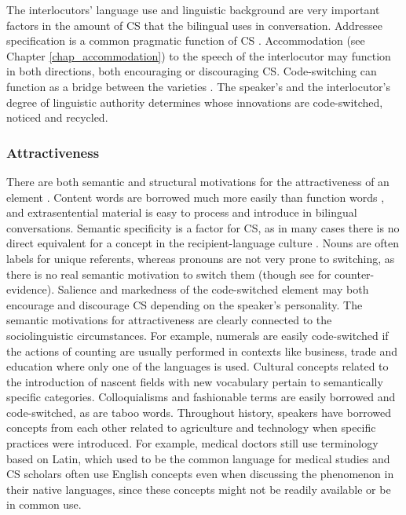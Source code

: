 \documentclass[output=paper]{langscibook}
\begin{document}
The interlocutors' language use and linguistic background are very important factors in the amount of CS that the bilingual uses in conversation. Addressee specification is a common pragmatic function of CS \parencite{gumperz1982discourse}. Accommodation (see Chapter \ref{chap_accommodation}) to the speech of the interlocutor may function in both directions, both encouraging or discouraging CS. Code-switching can function as a bridge between the varieties \parencite[78]{gardner2009code}. The speaker’s and the interlocutor’s degree of linguistic authority determines whose innovations are code-switched, noticed and recycled. 

\subsubsection{Attractiveness}

There are both semantic and structural motivations for the attractiveness of an element \parencite{johanson2002contact}. Content words are borrowed much more easily than function words \parencite{backus2013usage}, and extrasentential material is easy to process and introduce in bilingual conversations. Semantic specificity is a factor for CS, as in many cases there is no direct equivalent for a concept in the recipient-language culture \parencite{backus2001role}. Nouns are often labels for unique referents, whereas pronouns are not very prone to switching, as there is no real semantic motivation to switch them \parencite[133]{matras2009language} (though see \citealt{treffers2022explaining} for counter-evidence). Salience and markedness of the code-switched element may both encourage and discourage CS depending on the speaker’s personality. The semantic motivations for attractiveness are clearly connected to the sociolinguistic circumstances. For example, numerals are easily code-switched if the actions of counting are usually performed in contexts like business, trade and education where only one of the languages is used. Cultural concepts related to the introduction of nascent fields with new vocabulary pertain to semantically specific categories. Colloquialisms and fashionable terms are easily borrowed and code-switched, as are taboo words. Throughout history, speakers have borrowed concepts from each other related to agriculture and technology when specific practices were introduced. For example, medical doctors still use terminology based on Latin, which used to be the common language for medical studies and CS scholars often use English concepts even when discussing the phenomenon in their native languages, since these concepts might not be readily available or be in common use.
\end{document}

